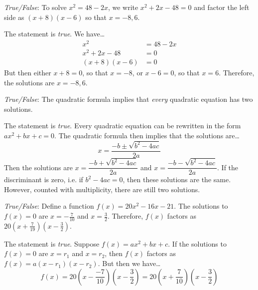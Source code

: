 \documentclass[11pt,letterpaper]{article}
\begin{document}
\quizsol \textit{True/False}: To solve $x^2= 48 - 2x$, we write $x^2 + 2x - 48= 0$ and factor the left side as $(x + 8)(x - 6)$ so that $x= -8, 6$. \pspace

\sol The statement is \textit{true}. We have\dots
	\[
	\begin{aligned}
	x^2&= 48 - 2x \\
	x^2 + 2x - 48&= 0 \\
	(x + 8)(x - 6)&= 0 
	\end{aligned}
	\]
But then either $x + 8= 0$, so that $x= -8$, or $x - 6=0$, so that $x= 6$. Therefore, the solutions are $x= -8, 6$. \pvspace{1cm}



\quizsol \textit{True/False}: The quadratic formula implies that \textit{every} quadratic equation has two solutions. \pspace

\sol The statement is \textit{true}. Every quadratic equation can be rewritten in the form $ax^2 + bx + c= 0$. The quadratic formula then implies that the solutions are\dots
	\[
	x= \dfrac{-b \pm \sqrt{b^2 - 4ac}}{2a}
	\]
Then the solutions are $x= \dfrac{-b + \sqrt{b^2 - 4ac}}{2a}$ and $x= \dfrac{-b - \sqrt{b^2 - 4ac}}{2a}$. If the discriminant is zero, i.e. if $b^2 - 4ac= 0$, then these solutions are the same. However, counted with multiplicity, there are still two solutions. 



\newpage



\quizsol \textit{True/False}: Define a function $f(x)= 20x^2 - 16x - 21$. The solutions to $f(x)= 0$ are $x= -\frac{7}{10}$ and $x= \frac{3}{2}$. Therefore, $f(x)$ factors as $20(x + \frac{7}{19})(x - \frac{3}{2})$. \pspace

\sol The statement is \textit{true}. Suppose $f(x)= ax^2 + bx + c$. If the solutions to $f(x)= 0$ are $x= r_1$ and $x= r_2$, then $f(x)$ factors as $f(x)= a(x - r_1)(x - r_2)$. But then we have\dots
	\[
	f(x)= 20 \left(x - \dfrac{-7}{10} \right) \left(x - \dfrac{3}{2} \right)= 20 \left(x + \dfrac{7}{10} \right) \left(x - \dfrac{3}{2} \right)
	\]
\end{document}
